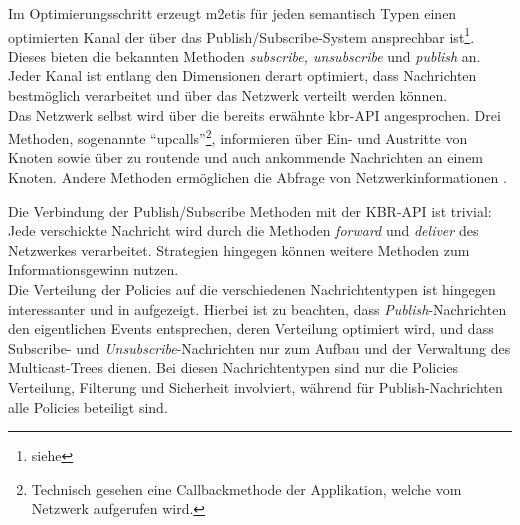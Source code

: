 Im Optimierungsschritt erzeugt \ac{m2etis} für jeden semantisch Typen einen optimierten Kanal der über das Publish/Subscribe-System ansprechbar ist\footnote{siehe }. Dieses bieten die bekannten Methoden \emph{subscribe, unsubscribe} und \emph{publish} an. Jeder Kanal ist entlang den Dimensionen derart optimiert, dass Nachrichten bestmöglich verarbeitet und über das Netzwerk verteilt werden können.\\
Das Netzwerk selbst wird über die bereits erwähnte \ac{kbr}-API angesprochen. Drei Methoden, sogenannte ``upcalls''\footnote{Technisch gesehen eine Callbackmethode der Applikation, welche vom Netzwerk aufgerufen wird.},  informieren über Ein- und Austritte von Knoten sowie über zu routende und auch ankommende Nachrichten an einem Knoten. Andere Methoden ermöglichen die Abfrage von Netzwerkinformationen \cite{Dabek2003Towards}.

Die Verbindung der Publish/Subscribe Methoden mit der KBR-API ist trivial: Jede verschickte Nachricht wird durch die Methoden \emph{forward} und \emph{deliver} des Netzwerkes verarbeitet. Strategien hingegen können weitere Methoden zum Informationsgewinn nutzen.\\
Die Verteilung der Policies auf die verschiedenen Nachrichtentypen ist hingegen interessanter und in  aufgezeigt. Hierbei ist zu beachten, dass \emph{Publish}-Nachrichten den eigentlichen Events entsprechen, deren Verteilung optimiert wird, und dass {Subscribe}- und \emph{Unsubscribe}-Nachrichten nur zum Aufbau und der Verwaltung des Multicast-Trees dienen. Bei diesen Nachrichtentypen sind nur die Policies Verteilung, Filterung und Sicherheit involviert, während für Publish-Nachrichten alle Policies beteiligt sind.

\begin{table}[!h]
\caption{Verbindungsmatrix}
\label{tab:verbindungsmatrix}
\end{table}

